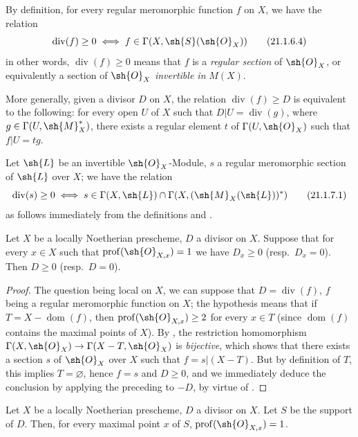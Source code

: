 By definition, for every regular meromorphic function $f$ on $X$, we have the relation
\[
\label{IV.21.1.6.4}
  \operatorname{div}(f)\geq 0 \iff f\in\Gamma(X,\sh{S}(\sh{O}_X))
  \tag{21.1.6.4}
\]
in other words, $\operatorname{div}(f)\geq 0$ means that $f$ is a \emph{regular section} of $\sh{O}_X$, or equivalently a section of $\sh{O}_X$ \emph{invertible in} $M(X)$.

More generally, given a divisor $D$ on $X$, the relation $\operatorname{div}(f)\geq D$ is equivalent to the following: for every open $U$ of $X$ such that $D|U=\operatorname{div}(g)$, where $g\in\Gamma(U,\sh{M}_X^*)$, there exists a regular element $t$ of $\Gamma(U,\sh{O}_X)$ such that $f|U=tg$.

\begin{env}[21.1.7]
\label{IV.21.1.7}
Let $\sh{L}$ be an invertible $\sh{O}_X$-Module, $s$ a regular meromorphic section of $\sh{L}$ over $X$;
we have the relation
\[
\label{IV.21.1.7.1}
  \operatorname{div}(s)\geq 0 \iff s\in\Gamma(X,\sh{L})\cap\Gamma(X,(\sh{M}_X(\sh{L}))^*)
  \tag{21.1.7.1}
\]
as follows immediately from the definitions  and .
\end{env}

\begin{proposition}[21.1.8]
\label{IV.21.1.8}
Let $X$ be a locally Noetherian prescheme, $D$ a divisor on $X$.
Suppose that for every $x\in X$ such that $\operatorname{prof}(\sh{O}_{X,x})=1$ we have $D_x\geq 0$ (resp.\ $D_x=0$).
Then $D\geq 0$ (resp.\ $D=0$).
\end{proposition}

\begin{proof}
The question being local on $X$, we can suppose that $D=\operatorname{div}(f)$, $f$ being a
regular meromorphic function on $X$;
the hypothesis means that if $T=X-\operatorname{dom}(f)$, then $\operatorname{prof}(\sh{O}_{X,x})\geq 2$ for every $x\in T$ (since $\operatorname{dom}(f)$ contains the maximal points of $X$).
By , the restriction homomorphism $\Gamma(X,\sh{O}_X)\to\Gamma(X-T,\sh{O}_X)$ is \emph{bijective}, which shows that there exists a section $s$ of $\sh{O}_X$ over $X$ such that $f=s|(X-T)$.
But by definition of $T$, this implies $T=\varnothing$, hence $f=s$ and $D\geq 0$, and we immediately deduce the conclusion by applying the preceding to $-D$, by virtue of .
\end{proof}

\begin{corollary}[21.1.9]
\label{IV.21.1.9}
Let $X$ be a locally Noetherian prescheme, $D$ a divisor on $X$.
Let $S$ be the support of $D$.
Then, for every maximal point $x$ of $S$, $\operatorname{prof}(\sh{O}_{X,x})=1$.
\end{corollary}

